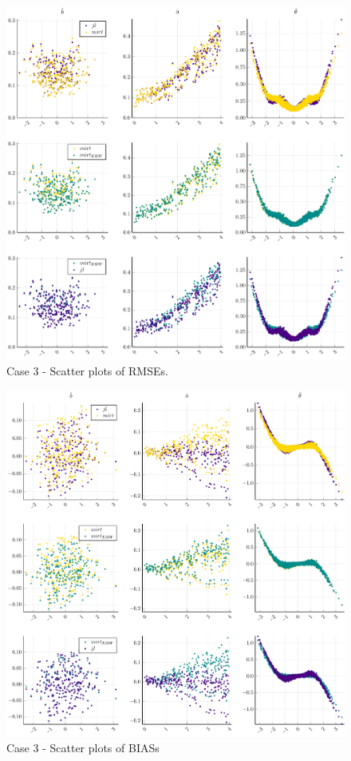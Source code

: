 \begin{figure}[H] 
	\centering
	\includegraphics[width=\textwidth]{Figures/3/RMSEscatter.pdf}
	\caption{Case 3 - Scatter plots of RMSEs.}
	\label{fig:spRMSE3}
\end{figure}
\begin{figure}[H] 
	\centering
	\includegraphics[width=\textwidth]{Figures/3/BIASscatter.pdf}
	\caption{Case 3 - Scatter plots of BIASs }
	\label{fig:spBIAS3}
\end{figure}
